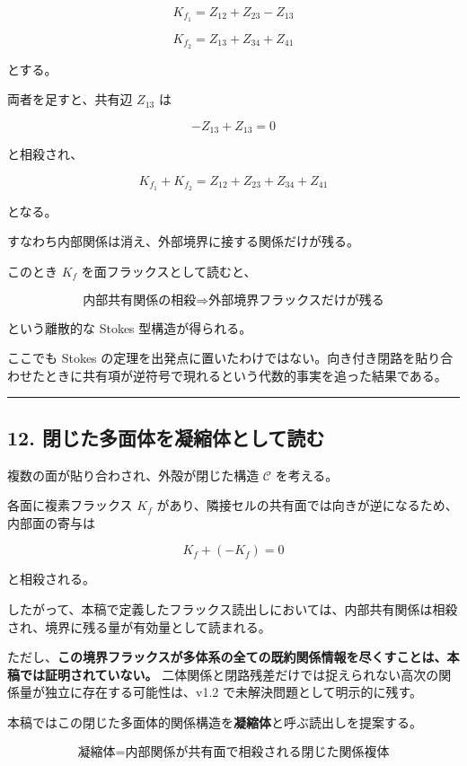 \documentclass[
  a4paper,
]{ltjsarticle}
\begin{document}
\[
K_{f_1}=Z_{12}+Z_{23}-Z_{13}
\]

\[
K_{f_2}=Z_{13}+Z_{34}+Z_{41}
\]

とする。

両者を足すと、共有辺 \(Z_{13}\) は

\[
-Z_{13}+Z_{13}=0
\]

と相殺され、

\[
\boxed{K_{f_1}+K_{f_2}=Z_{12}+Z_{23}+Z_{34}+Z_{41}}
\]

となる。

すなわち内部関係は消え、外部境界に接する関係だけが残る。

このとき \(K_f\) を面フラックスとして読むと、

\[
\boxed{\text{内部共有関係の相殺}\Rightarrow\text{外部境界フラックスだけが残る}}
\]

という離散的な Stokes 型構造が得られる。

ここでも Stokes
の定理を出発点に置いたわけではない。向き付き閉路を貼り合わせたときに共有項が逆符号で現れるという代数的事実を追った結果である。

\begin{center}\rule{0.5\linewidth}{0.5pt}\end{center}

\subsection{12.
閉じた多面体を凝縮体として読む}\label{ux9589ux3058ux305fux591aux9762ux4f53ux3092ux51ddux7e2eux4f53ux3068ux3057ux3066ux8aadux3080}

複数の面が貼り合わされ、外殻が閉じた構造 \(\mathcal C\) を考える。

各面に複素フラックス \(K_f\)
があり、隣接セルの共有面では向きが逆になるため、内部面の寄与は

\[
K_f+(-K_f)=0
\]

と相殺される。

したがって、本稿で定義したフラックス読出しにおいては、内部共有関係は相殺され、境界に残る量が有効量として読まれる。

ただし、\textbf{この境界フラックスが多体系の全ての既約関係情報を尽くすことは、本稿では証明されていない。}
二体関係と閉路残差だけでは捉えられない高次の関係量が独立に存在する可能性は、v1.2
で未解決問題として明示的に残す。

本稿ではこの閉じた多面体的関係構造を\textbf{凝縮体}と呼ぶ読出しを提案する。

\[
\boxed{\text{凝縮体}=\text{内部関係が共有面で相殺される閉じた関係複体}}
\]
\end{document}
